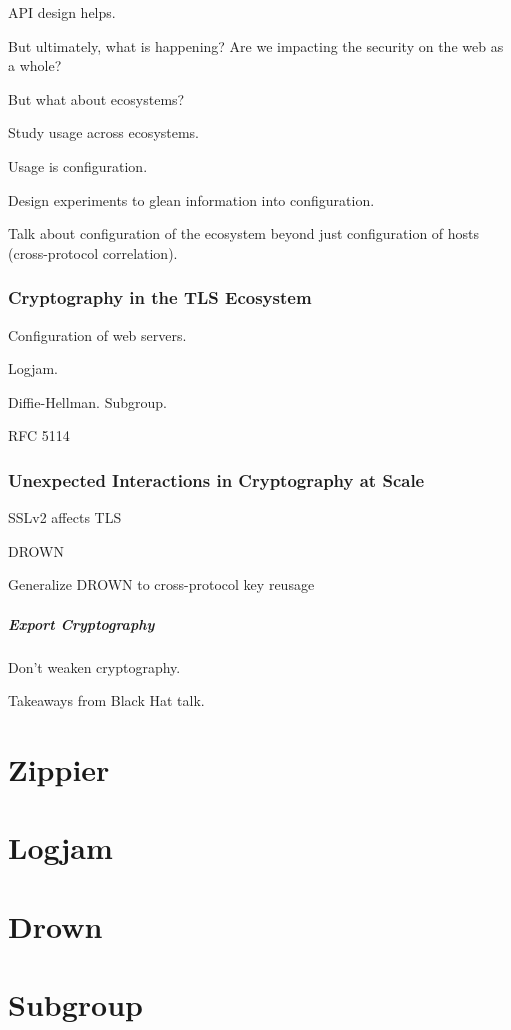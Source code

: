 API design helps.

But ultimately, what is happening? Are we impacting the security on the web as a whole?

But what about ecosystems?

Study usage across ecosystems.

Usage is configuration.

Design experiments to glean information into configuration.

Talk about configuration of the ecosystem beyond just configuration of hosts (cross-protocol correlation).

\subsection{Cryptography in the TLS Ecosystem}

Configuration of web servers.

Logjam.

Diffie-Hellman. Subgroup.

RFC 5114

\subsection{Unexpected Interactions in Cryptography at Scale}

SSLv2 affects TLS

DROWN

Generalize DROWN to cross-protocol key reusage

\paragraph{Export Cryptography}
Don't weaken cryptography.

Takeaways from Black Hat talk.

\chapter{Zippier}

\chapter{Logjam}

\chapter{Drown}

\chapter{Subgroup}


